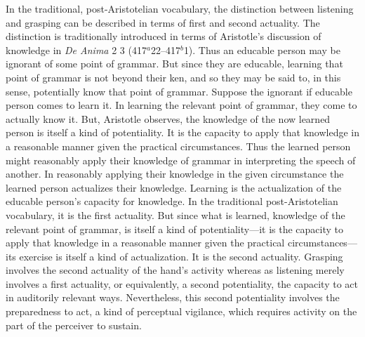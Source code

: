 In the traditional, post-Aristotelian vocabulary, the distinction between listening and grasping can be described in terms of first and second actuality. The distinction is traditionally introduced in terms of Aristotle's discussion of knowledge in \emph{De Anima} 2 3 (417\( ^{a} \)22--417\( ^{b} \)1). Thus an educable person may be ignorant of some point of grammar. But since they are educable, learning that point of grammar is not beyond their ken, and so they may be said to, in this sense, potentially know that point of grammar. Suppose the ignorant if educable person comes to learn it. In learning the relevant point of grammar, they come to actually know it. But, Aristotle observes, the knowledge of the now learned person is itself a kind of potentiality. It is the capacity to apply that knowledge in a reasonable manner given the practical circumstances. Thus the learned person might reasonably apply their knowledge of grammar in interpreting the speech of another. In reasonably applying their knowledge in the given circumstance the learned person actualizes their knowledge. Learning is the actualization of the educable person's capacity for knowledge. In the traditional post-Aristotelian vocabulary, it is the first actuality. But since what is learned, knowledge of the relevant point of grammar, is itself a kind of potentiality---it is the capacity to apply that knowledge in a reasonable manner given the practical circumstances---its exercise is itself a kind of actualization. It is the second actuality. Grasping involves the second actuality of the hand's activity whereas as listening merely involves a first actuality, or equivalently, a second potentiality, the capacity to act in auditorily relevant ways. Nevertheless, this second potentiality involves the preparedness to act, a kind of perceptual vigilance, which requires activity on the part of the perceiver to sustain.

